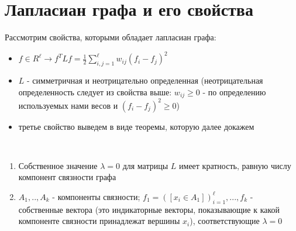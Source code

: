 \documentclass[12pt,fleqn]{article}
\begin{document}
\section{Лапласиан графа и его свойства}
Рассмотрим свойства, которыми обладает лапласиан графа:
\begin{itemize}
	\item $f \in R^{\ell} \to f^TLf=\frac{1}{2}\sum^{\ell}_{i,j=1}w_{ij}(f_i-f_j)^2$
	\item $L$ - симметричная и неотрицательно определенная (неотрицательная определенность следует из свойства выше: $w_{ij} \geq 0$ - по определению используемых нами весов и $(f_i - f_j)^2 \geq 0$)
	\item третье свойство выведем в виде теоремы, которую далее докажем
\end{itemize}

\begin{vkTheorem}
	 
	\begin{enumerate}
		\item Собственное значение $\lambda = 0$ для матрицы $L$ имеет кратность, равную числу компонент связности графа
		\item $A_1,..,A_k$ - компоненты связности; $f_1=([x_i \in A_1])^{\ell}_{i=1},...,f_k$ - собственные вектора (это индикаторные векторы, показывающие к какой компоненте связности принадлежат вершины $x_i$), соответствующие $\lambda = 0$
	\end{enumerate}
\end{vkTheorem}
\end{document}

